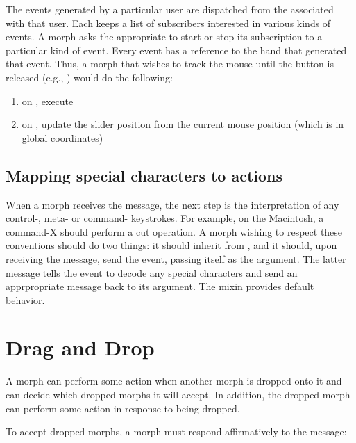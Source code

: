 \documentclass[letterpaper,10pt,english]{sphinxmanual}
\begin{document}
The events generated by a particular user are dispatched from the  associated with that user. Each  keeps a list of subscribers interested in various kinds of events. A morph asks the appropriate  to start or stop its subscription to a particular kind of event. Every event has a reference to the hand that generated that event. Thus, a morph that wishes to track the mouse until the button is released (e.g., ) would do the following:
\begin{enumerate}
\item {} 
on , execute 

\item {} 
on , update the slider position from the current mouse position (which is in global coordinates)

\end{enumerate}


\subsection{Mapping special characters to actions}
\label{\detokenize{morphic:mapping-special-characters-to-actions}}
When a morph receives the  message, the next step is the interpretation of any control-, meta- or command- keystrokes. For example, on the Macintosh, a command-X should perform a cut operation. A morph wishing to respect these conventions should do two things: it should inherit from , and it should, upon receiving the  message, send  the event, passing itself as the argument. The latter message tells the event to decode any special characters and send an apprpropriate message back to its argument. The mixin provides default behavior.


\section{Drag and Drop}
\label{\detokenize{morphic:drag-and-drop}}
A morph can perform some action when another morph is dropped onto it and can decide which dropped morphs it will accept. In addition, the dropped morph can perform some action in response to being dropped.

To accept dropped morphs, a morph must respond affirmatively to the message:
\end{document}
